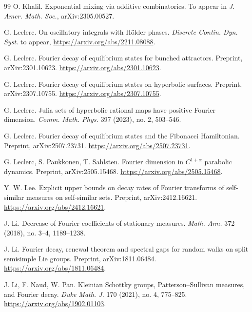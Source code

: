 \documentclass[12pt]{amsart}
\theoremstyle{definition}
\begin{document}
\begin{thebibliography}{99}
O. Khalil.
\newblock Exponential mixing via additive combinatorics.
\newblock To appear in \emph{J. Amer. Math. Soc.}, arXiv:2305.00527.

G. Leclerc.
\newblock On oscillatory integrals with H\"older phases.
\newblock \emph{Discrete Contin. Dyn. Syst.} to appear, \url{https://arxiv.org/abs/2211.08088}.

G. Leclerc.
\newblock Fourier decay of equilibrium states for bunched attractors.
\newblock Preprint, arXiv:2301.10623.
\newblock \url{https://arxiv.org/abs/2301.10623}.

G. Leclerc.
\newblock Fourier decay of equilibrium states on hyperbolic surfaces.
\newblock Preprint, arXiv:2307.10755.
\newblock \url{https://arxiv.org/abs/2307.10755}.

G. Leclerc.
\newblock Julia sets of hyperbolic rational maps have positive Fourier dimension.
\newblock \emph{Comm. Math. Phys.} 397 (2023), no. 2, 503--546.

G. Leclerc.
\newblock Fourier decay of equilibrium states and the Fibonacci Hamiltonian.
\newblock Preprint, arXiv:2507.23731.
\newblock \url{https://arxiv.org/abs/2507.23731}.

G. Leclerc, S. Paukkonen, T. Sahlsten.
\newblock Fourier dimension in \(C^{1+\alpha}\) parabolic dynamics.
\newblock Preprint, arXiv:2505.15468.
\newblock \url{https://arxiv.org/abs/2505.15468}.

Y. W. Lee.
\newblock Explicit upper bounds on decay rates of Fourier transforms of self-similar measures on self-similar sets.
\newblock Preprint, arXiv:2412.16621.
\newblock \url{https://arxiv.org/abs/2412.16621}.

J. Li.
\newblock Decrease of Fourier coefficients of stationary measures.
\newblock \emph{Math. Ann.} 372 (2018), no. 3--4, 1189--1238.

J. Li.
\newblock Fourier decay, renewal theorem and spectral gaps for random walks on split semisimple Lie groups.
\newblock Preprint, arXiv:1811.06484.
\newblock \url{https://arxiv.org/abs/1811.06484}.

J. Li, F. Naud, W. Pan.
\newblock Kleinian Schottky groups, Patterson--Sullivan measures, and Fourier decay.
\newblock \emph{Duke Math. J.} 170 (2021), no. 4, 775--825.
\newblock \url{https://arxiv.org/abs/1902.01103}.


\end{thebibliography}
\end{document}
